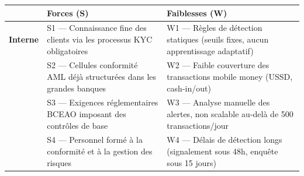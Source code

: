 \documentclass[
  12pt,
]{article}
\newcounter{none} %
\begin{document}
{\def\LTcaptype{none} %
\begin{longtable}[]{@{}
  >{\raggedright\arraybackslash}p{}
  >{\raggedright\arraybackslash}p{}
  >{\raggedright\arraybackslash}p{}@{}}
\toprule\noalign{}
\begin{minipage}[b]{\linewidth}\raggedright
\end{minipage} & \begin{minipage}[b]{\linewidth}\raggedright
Forces (S)
\end{minipage} & \begin{minipage}[b]{\linewidth}\raggedright
Faiblesses (W)
\end{minipage} \\
\midrule\noalign{}
\endhead
\bottomrule\noalign{}
\endlastfoot
\textbf{Interne} & S1 — Connaissance fine des clients via les processus
KYC obligatoires & W1 — Règles de détection statiques (seuils fixes,
aucun apprentissage adaptatif) \\
& S2 — Cellules conformité AML déjà structurées dans les grandes banques
& W2 — Faible couverture des transactions mobile money (USSD,
cash-in/out) \\
& S3 — Exigences réglementaires BCEAO imposant des contrôles de base &
W3 — Analyse manuelle des alertes, non scalable au-delà de 500
transactions/jour \\
& S4 — Personnel formé à la conformité et à la gestion des risques & W4
— Délais de détection longs (signalement sous 48h, enquête sous 15
jours) \\
\end{longtable}
}
\end{document}
